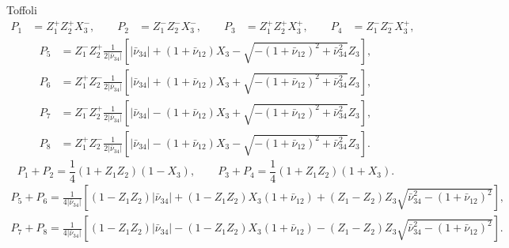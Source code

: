 \begin{tbox}[label=tcolorbox:toffoli]{Toffoli}
\fontsize{9pt}{9pt}\selectfont
	\begin{equation*}
	\begin{aligned}
		P_1 &= Z_1^+ Z_2^+ X_3^-,
		\qquad
		P_2 &= Z_1^- Z_2^- X_3^-,
		\qquad
		P_3 &= Z_1^+ Z_2^+ X_3^+,
		\qquad
		P_4 &= Z_1^- Z_2^- X_3^+,
	\end{aligned}
	\end{equation*}
	\begin{equation*}
	\begin{aligned}
		P_5 &= Z_1^- Z_2^+ \frac{1}{2\lvert\bar{\nu}_{34}\rvert}
		\left[
			\lvert\bar\nu_{34}\rvert +
			(1 + \bar\nu_{12}) X_3 -
			\sqrt{-(1 + \bar\nu_{12})^2 + \bar\nu_{34}^2} Z_3
		\right], \\
		P_6 &= Z_1^+ Z_2^- \frac{1}{2\lvert\bar{\nu}_{34}\rvert}
		\left[
			\lvert\bar\nu_{34}\rvert +
			(1 + \bar\nu_{12}) X_3 +
			\sqrt{-(1 + \bar\nu_{12})^2 + \bar\nu_{34}^2} Z_3
		\right], \\
		P_7 &= Z_1^- Z_2^+ \frac{1}{2\lvert\bar{\nu}_{34}\rvert}
		\left[
			\lvert\bar\nu_{34}\rvert -
			(1 + \bar\nu_{12}) X_3 +
			\sqrt{-(1 + \bar\nu_{12})^2 + \bar\nu_{34}^2} Z_3
		\right], \\
		P_8 &= Z_1^+ Z_2^- \frac{1}{2\lvert\bar{\nu}_{34}\rvert}
		\left[
			\lvert\bar\nu_{34}\rvert -
			(1 + \bar\nu_{12}) X_3 -
			\sqrt{-(1 + \bar\nu_{12})^2 + \bar\nu_{34}^2} Z_3
		\right].
	\end{aligned}
	\end{equation*}
	\begin{equation*}
		P_1 + P_2 = \frac{1}{4} (1 + Z_1 Z_2) (1 - X_3),
		\qquad
		P_3 + P_4 = \frac{1}{4} (1 + Z_1 Z_2) (1 + X_3).
	\end{equation*}
	\begin{align*}
		P_5 + P_6 = \frac{1}{4\lvert\bar\nu_{34}\rvert} \left[
			(1 - Z_1 Z_2) \lvert\bar\nu_{34}\rvert +
			(1 - Z_1 Z_2) X_3 (1 + \bar\nu_{12}) +
			(Z_1 - Z_2)Z_3 \sqrt{\bar\nu_{34}^2 - (1 + \bar\nu_{12})^2}
		\right], \\
		P_7 + P_8 = \frac{1}{4\lvert\bar\nu_{34}\rvert} \left[
			(1 - Z_1 Z_2) \lvert\bar\nu_{34}\rvert -
			(1 - Z_1 Z_2) X_3 (1 + \bar\nu_{12}) -
			(Z_1 - Z_2)Z_3 \sqrt{\bar\nu_{34}^2 - (1 + \bar\nu_{12})^2}
		\right].
	\end{align*}

\end{tbox}
